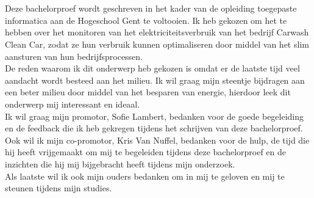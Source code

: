 
\chapter*{}%
\label{ch:voorwoord}


Deze bachelorproef wordt geschreven in het kader van de opleiding toegepaste informatica aan de Hogeschool Gent te voltooien. Ik heb gekozen om het te hebben over het monitoren van het elektriciteitsverbruik van het bedrijf Carwash Clean Car, zodat ze hun verbruik kunnen optimaliseren door middel van het slim aansturen van hun bedrijfsprocessen.\\

De reden waarom ik dit onderwerp heb gekozen is omdat er de laatste tijd veel aandacht wordt besteed aan het milieu. Ik wil graag mijn steentje bijdragen aan een beter milieu door middel van het besparen van energie, hierdoor leek dit onderwerp mij interessant en ideaal.\\

Ik wil graag mijn promotor, Sofie Lambert, bedanken voor de goede begeleiding en de feedback die ik heb gekregen tijdens het schrijven van deze bachelorproef.\\

Ook wil ik mijn co-promotor, Kris Van Nuffel, bedanken voor de hulp, de tijd die hij heeft vrijgemaakt om mij te begeleiden tijdens deze bachelorproef en de inzichten die hij mij bijgebracht heeft tijdens mijn onderzoek.\\

Als laatste wil ik ook mijn ouders bedanken om in mij te geloven en mij te steunen tijdens mijn studies.